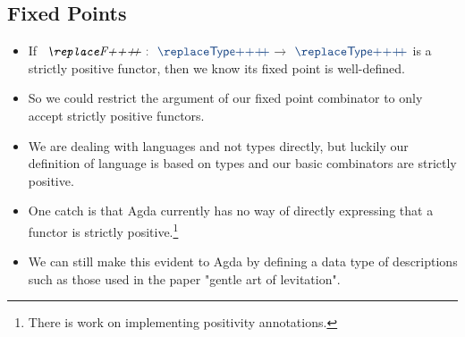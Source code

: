 \subsection{Fixed Points}

\begin{itemize}
\item If $\ab{F}~\as{:}~\af{Type}~\as{→}~\af{Type}$ is a strictly positive functor, then we know its fixed point is well-defined.
\item So we could restrict the argument of our fixed point combinator to only accept strictly positive functors.
\item We are dealing with languages and not types directly, but luckily our definition of language is based on types and our basic combinators are strictly positive.
\item One catch is that Agda currently has no way of directly expressing that a functor is strictly positive.\footnote{There is work on implementing positivity annotations.}
\item We can still make this evident to Agda by defining a data type of descriptions such as those used in the paper "gentle art of levitation".
\end{itemize}

\begin{code}[hide]%
\>[0]\AgdaSpace{}%
\AgdaSpace{}%
\<%
\end{code}

